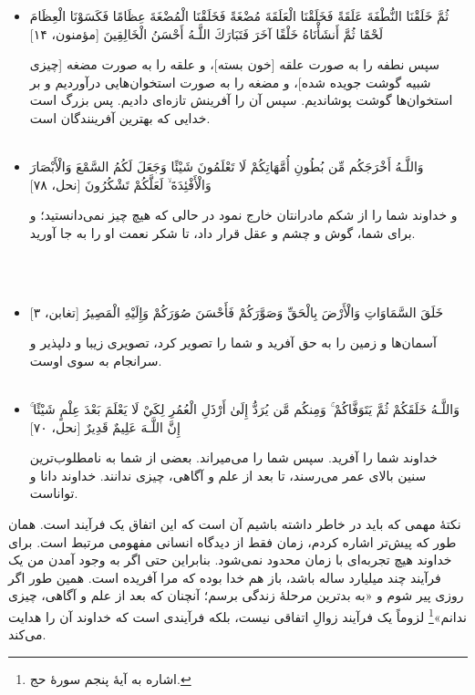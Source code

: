 \begin{itemize}
	\item[]
	{
		ثُمَّ خَلَقْنَا النُّطْفَةَ عَلَقَةً فَخَلَقْنَا الْعَلَقَةَ مُضْغَةً فَخَلَقْنَا الْمُضْغَةَ عِظَامًا فَكَسَوْنَا الْعِظَامَ لَحْمًا ثُمَّ أَنشَأْنَاهُ خَلْقًا آخَرَ  فَتَبَارَكَ اللَّـهُ أَحْسَنُ الْخَالِقِينَ [مؤمنون، ۱۴]}
	
	{
		سپس نطفه را به صورت علقه [خون بسته‌]، و علقه را به صورت مضغه [چیزی شبیه گوشت جویده شده‌]، و مضغه را به صورت استخوان‌هایی درآوردیم و بر استخوان‌ها گوشت پوشاندیم. سپس آن را آفرینش تازه‌ای دادیم. پس بزرگ است خدایی که بهترین آفرینندگان است.
	}
	~\\~
	\item[]
	{
		وَاللَّـهُ أَخْرَجَكُم مِّن بُطُونِ أُمَّهَاتِكُمْ لَا تَعْلَمُونَ شَيْئًا وَجَعَلَ لَكُمُ السَّمْعَ وَالْأَبْصَارَ وَالْأَفْئِدَةَ ۙ لَعَلَّكُمْ تَشْكُرُونَ [نحل، ۷۸]}
	
	
	{
		و خداوند شما را از شکم مادرانتان خارج نمود در حالی که هیچ چیز نمی‌دانستید؛ و برای شما، گوش و چشم و عقل قرار داد، تا شکر نعمت او را به جا آورید.  
	}
	
	~\\~
	\item[]
	{
		خَلَقَ السَّمَاوَاتِ وَالْأَرْضَ بِالْحَقِّ وَصَوَّرَكُمْ فَأَحْسَنَ صُوَرَكُمْ وَإِلَيْهِ الْمَصِيرُ [تغابن، ۳]}
	
	{
		آسمان‌ها و زمین را به حق آفرید و شما را  تصویر کرد، تصویری زیبا و دلپذیر و سرانجام به سوی اوست. 
	}
	~\\~
	\item[]
	{
		وَاللَّـهُ خَلَقَكُمْ ثُمَّ يَتَوَفَّاكُمْ ۚ وَمِنكُم مَّن يُرَدُّ إِلَىٰ أَرْذَلِ الْعُمُرِ لِكَيْ لَا يَعْلَمَ بَعْدَ عِلْمٍ شَيْئًا ۚ إِنَّ اللَّـهَ عَلِيمٌ قَدِيرٌ [نحل، ۷۰]}
	
	{
		خداوند شما را آفرید. سپس شما را می‌میراند. بعضی از شما به نامطلوب‌ترین سنین بالای عمر می‌رسند، تا بعد از علم و آگاهی، چیزی ندانند. خداوند دانا و تواناست. 
	}
\end{itemize}

نکتهٔ مهمی که باید در خاطر داشته باشیم آن است که این  اتفاق یک فرآیند است. همان طور که پیش‌تر اشاره کردم، زمان فقط از دیدگاه انسانی مفهومی مرتبط است. برای خداوند هیچ تجربه‌ای با زمان محدود نمی‌شود. بنابراین حتی اگر به وجود آمدن من یک فرآیند چند میلیارد ساله باشد، باز هم خدا بوده که مرا آفریده است. همین طور اگر روزی پیر شوم و «به بدترین مرحلهٔ زندگی برسم؛ آنچنان که بعد از علم و آگاهی، چیزی ندانم»\footnote
{اشاره به آیهٔ پنجم سورهٔ حج.}  
لزوماً یک فرآیند زوالِ اتفاقی نیست، بلکه فرآیندی است که خداوند آن را هدایت می‌کند.

